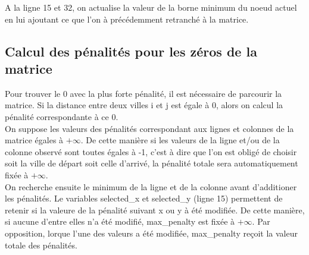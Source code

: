 \documentclass[a4paper]{article}
\begin{document}
A la ligne 15 et 32, on actualise la valeur de la borne minimum du noeud actuel en lui ajoutant ce que l'on à précédemment retranché à la matrice.


\subsection{Calcul des pénalités pour les zéros de la matrice}

Pour trouver le 0 avec la plus forte pénalité, il est nécessaire de parcourir la matrice. Si la distance entre deux villes i et j est égale à 0, alors on calcul la pénalité correspondante à ce 0. \\
On suppose les valeurs des pénalités correspondant aux lignes et colonnes de la matrice égales à $+\infty$. De cette manière si les valeurs de la ligne et/ou de la colonne observé sont toutes égales à -1, c'est à dire que l'on est obligé de choisir soit la ville de départ soit celle d'arrivé, la pénalité totale sera automatiquement fixée à $+\infty$.\\
On recherche ensuite le minimum de la ligne et de la colonne avant d'additioner les pénalités. Le variables selected\_x et selected\_y (ligne 15) permettent de retenir si la valeure de la pénalité suivant x ou y à été modifiée. De cette manière, si aucune d'entre elles n'a été modifié, max\_penalty est fixée à $+\infty$. Par opposition, lorque l'une des valeurs a été modifiée, max\_penalty reçoit la valeur totale des pénalités.
\end{document}
